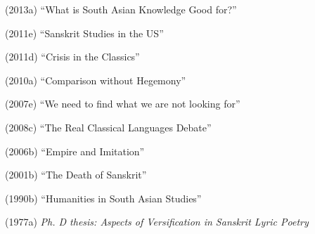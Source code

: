  \item (2013a) “What is South Asian Knowledge Good for?”

 \item (2011e) “Sanskrit Studies in the US”

 \item (2011d) “Crisis in the Classics”

 \item (2010a) “Comparison without Hegemony”

 \item (2007e) “We need to find what we are not looking for”

 \item (2008c) “The Real Classical Languages Debate”

 \item (2006b) “Empire and Imitation”

 \item (2001b) “The Death of Sanskrit”

 \item (1990b) “Humanities in South Asian Studies”

 \item (1977a) \textit{Ph. D thesis: Aspects of Versification in Sanskrit Lyric Poetry}


